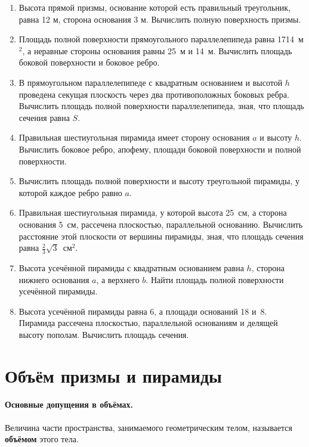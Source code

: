 \begin{enumerate}

\item
Высота прямой призмы, основание которой есть правильный треугольник, равна 12 м, сторона основания 3 м.
Вычислить полную поверхность призмы.

\item
Площадь полной поверхности прямоугольного параллелепипеда равна 1714~м$^2$, а неравные стороны основания равны 25~м и 14~м.
Вычислить площадь боковой поверхности и боковое ребро.

\item
В прямоугольном параллелепипеде с квадратным основанием и высотой $h$ проведена секущая плоскость через два противоположных боковых ребра.
Вычислить площадь полной поверхности параллелепипеда, зная, что площадь сечения равна $S$.

\item
Правильная шестиугольная пирамида имеет сторону основания $a$ и высоту $h$.
Вычислить боковое ребро, апофему, площади боковой поверхности и полной поверхности.

\item
Вычислить площадь полной поверхности и высоту треугольной пирамиды, у которой каждое ребро равно $a$.

\item
Правильная шестиугольная пирамида, у которой высота 25~см, а сторона основания 5~см, рассечена плоскостью, параллельной основанию.
Вычислить расстояние этой плоскости от вершины пирамиды, зная, что площадь сечения равна $\tfrac23\sqrt{3}$~см$^2$.

\item
Высота усечённой пирамиды с квадратным основанием равна $h$, сторона нижнего основания $a$, а верхнего $b$.
Найти площадь полной поверхности усечённой пирамиды.

\item
Высота усечённой пирамиды равна 6, а площади оснований 18 и~8.
Пирамида рассечена плоскостью, параллельной основаниям и делящей высоту пополам.
Вычислить площадь сечения.
\end{enumerate}

\section{Объём призмы и пирамиды}

\paragraph{Основные допущения в объёмах.}\label{1938/s82}
Величина части пространства, занимаемого геометрическим телом, называется \textbf{объёмом} этого тела.

